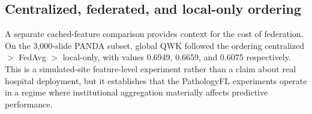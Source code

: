 \subsection{Centralized, federated, and local-only ordering}
A separate cached-feature comparison provides context for the cost of federation. On the 3,000-slide PANDA subset, global QWK followed the ordering centralized $>$ FedAvg $>$ local-only, with values 0.6949, 0.6659, and 0.6075 respectively. This is a simulated-site feature-level experiment rather than a claim about real hospital deployment, but it establishes that the PathologyFL experiments operate in a regime where institutional aggregation materially affects predictive performance.
